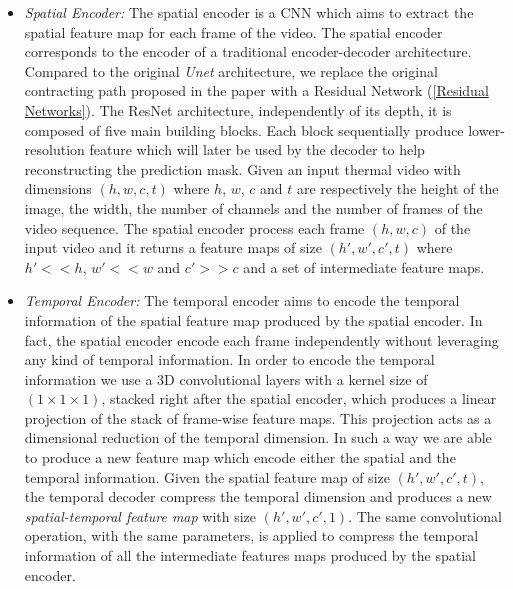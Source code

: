 \begin{itemize}
    \item \textit{Spatial Encoder:} The spatial encoder is a CNN which aims to extract the spatial feature map for each frame of the video. The spatial encoder corresponds to the encoder of a traditional encoder-decoder architecture. Compared to the original \textit{Unet} architecture, we replace the original contracting path proposed in the paper with a Residual Network (\ref{Residual Networks}). The ResNet architecture, independently of its depth, it is composed of five main building blocks. Each block sequentially produce lower-resolution feature which will later be used by the decoder to help reconstructing the prediction mask. Given an input thermal video with dimensions $(h, w, c, t)$ where $h$, $w$, $c$ and $t$ are respectively the height of the image, the width, the number of channels and the number of frames of the video sequence. The spatial encoder process each frame $(h, w, c)$ of the input video and it returns a feature maps of size $(h', w', c', t)$ where $h'<<h$, $w'<<w$ and $c'>>c$ and a set of intermediate feature maps.

    \item \textit{Temporal Encoder:} The temporal encoder aims to encode the temporal information of the spatial feature map produced by the spatial encoder. In fact, the spatial encoder encode each frame independently without leveraging any kind of temporal information. In order to encode the temporal information we use a 3D convolutional layers with a kernel size of $(1\times1\times1)$, stacked right after the spatial encoder, which produces a linear projection of the stack of frame-wise feature maps. This projection acts as a dimensional reduction of the temporal dimension. In such a way we are able to produce a new feature map which encode either the spatial and the temporal information. Given the spatial feature map of size $(h', w', c', t)$, the temporal decoder compress the temporal dimension and produces a new \textit{spatial-temporal feature map} with size $(h', w', c', 1)$.  The same convolutional operation, with the same parameters, is applied to compress the temporal information of all the intermediate features maps produced by the spatial encoder.
    

\end{itemize}
